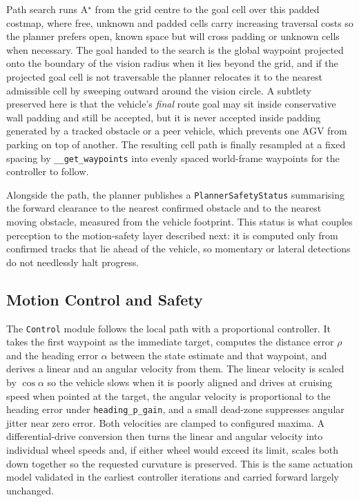 Path search runs A$^\star$ from the grid centre to the goal cell over this padded costmap, where free, unknown and padded cells carry increasing traversal costs so the planner prefers open, known space but will cross padding or unknown cells when necessary. The goal handed to the search is the global waypoint projected onto the boundary of the vision radius when it lies beyond the grid, and if the projected goal cell is not traversable the planner relocates it to the nearest admissible cell by sweeping outward around the vision circle. A subtlety preserved here is that the vehicle's \emph{final} route goal may sit inside conservative wall padding and still be accepted, but it is never accepted inside padding generated by a tracked obstacle or a peer vehicle, which prevents one AGV from parking on top of another. The resulting cell path is finally resampled at a fixed spacing by \texttt{\_\_get\_waypoints} into evenly spaced world-frame waypoints for the controller to follow.

Alongside the path, the planner publishes a \texttt{PlannerSafetyStatus} summarising the forward clearance to the nearest confirmed obstacle and to the nearest moving obstacle, measured from the vehicle footprint. This status is what couples perception to the motion-safety layer described next: it is computed only from confirmed tracks that lie ahead of the vehicle, so momentary or lateral detections do not needlessly halt progress.

\subsection{Motion Control and Safety}
\label{subsec:controllers-control}

The \texttt{Control} module follows the local path with a proportional controller. It takes the first waypoint as the immediate target, computes the distance error $\rho$ and the heading error $\alpha$ between the state estimate and that waypoint, and derives a linear and an angular velocity from them. The linear velocity is scaled by $\cos\alpha$ so the vehicle slows when it is poorly aligned and drives at cruising speed when pointed at the target, the angular velocity is proportional to the heading error under \texttt{heading\_p\_gain}, and a small dead-zone suppresses angular jitter near zero error. Both velocities are clamped to configured maxima. A differential-drive conversion then turns the linear and angular velocity into individual wheel speeds and, if either wheel would exceed its limit, scales both down together so the requested curvature is preserved. This is the same actuation model validated in the earliest controller iterations and carried forward largely unchanged.

